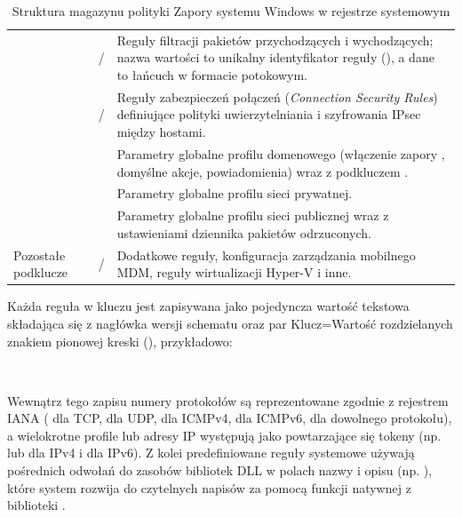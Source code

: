 \begin{table}[H]
    \centering
    \caption{Struktura magazynu polityki Zapory systemu Windows w rejestrze systemowym}\label{tab:rejestr-zapory}
    \tablefont
    \begin{tabularx}{\linewidth}{L{3.8cm} L{2.9cm} Y}
        \toprule
         &  &  \\
        \midrule
         &  /  & Reguły filtracji pakietów przychodzących i wychodzących; nazwa wartości to unikalny identyfikator reguły (), a dane to łańcuch w formacie potokowym. \\
         &  /  & Reguły zabezpieczeń połączeń (\textit{Connection Security Rules}) definiujące polityki uwierzytelniania i szyfrowania IPsec między hostami. \\
         &  & Parametry globalne profilu domenowego (włączenie zapory , domyślne akcje, powiadomienia) wraz z podkluczem . \\
         &  & Parametry globalne profilu sieci prywatnej. \\
         &  & Parametry globalne profilu sieci publicznej wraz z ustawieniami dziennika pakietów odrzuconych. \\
        Pozostałe podklucze &  /  & Dodatkowe reguły, konfiguracja zarządzania mobilnego MDM, reguły wirtualizacji Hyper-V i inne. \\
        \bottomrule
    \end{tabularx}
\end{table}

Każda reguła w kluczu  jest zapisywana jako pojedyncza wartość tekstowa składająca się z nagłówka wersji schematu oraz par Klucz=Wartość rozdzielanych znakiem pionowej kreski (\code{|}), przykładowo:
\begin{center}
    {\footnotesize{}}\\[-2pt]
    {\footnotesize{}}
\end{center}
Wewnątrz tego zapisu numery protokołów są reprezentowane zgodnie z rejestrem IANA ( dla TCP,  dla UDP,  dla ICMPv4,  dla ICMPv6,  dla dowolnego protokołu), a wielokrotne profile lub adresy IP występują jako powtarzające się tokeny (np.  lub  dla IPv4 i  dla IPv6). Z kolei predefiniowane reguły systemowe używają pośrednich odwołań do zasobów bibliotek DLL w polach nazwy i opisu (np. ), które system rozwija do czytelnych napisów za pomocą funkcji natywnej  z biblioteki .

